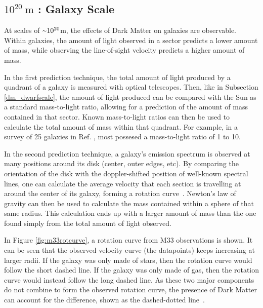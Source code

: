   \subsection{$10^{20}\:\text{m}$ : Galaxy Scale}
    At scales of $\nicetilde 10^{20}$m, the effects of Dark Matter on galaxies are observable.
    Within galaxies, the amount of light observed in a sector predicts a lower amount of mass, while observing the line-of-sight velocity predicts a higher amount of mass.
    
    In the first prediction technique, the total amount of light produced by a quadrant of a galaxy is measured with optical telescopes.
    Then, like in Subsection \ref{dm_dwarfscale}, the amount of light produced can be compared with the Sun as a standard mass-to-light ratio, allowing for a prediction of the amount of mass contained in that sector.
    Known mass-to-light ratios can then be used to calculate the total amount of mass within that quadrant.
    For example, in a survey of 25 galaxies in Ref. \cite{galaxy_mass_light_ratio}, most possesed a mass-to-light ratio of 1 to 10.

    In the second prediction technique, a galaxy's emission spectrum is observed at many positions around its disk (center, outer edges, etc).
    By comparing the orientation of the disk with the doppler-shifted position of well-known spectral lines, one can calculate the average velocity that each section is travelling at around the center of its galaxy, forming a rotation curve~\cite{rotation_curve_review,spiral_galaxy_rot_curve,milkyway_dm_evidence}.
    Newton's law of gravity can then be used to calculate the mass contained within a sphere of that same radius.
    This calculation ends up with a larger amount of mass than the one found simply from the total amount of light observed.
    
    In Figure \ref{fig:m33rotcurve}, a rotation curve from M33 observations is shown.
    It can be seen that the observed velocity curve (the datapoints) keeps increasing at larger radii.
    If the galaxy was only made of stars, then the rotation curve would follow the short dashed line.
    If the galaxy was only made of gas, then the rotation curve would instead follow the long dashed line.
    As these two major components do not combine to form the observed rotation curve, the presence of Dark Matter can account for the difference, shown as the dashed-dotted line~\cite{m33rotcurve}.
    
